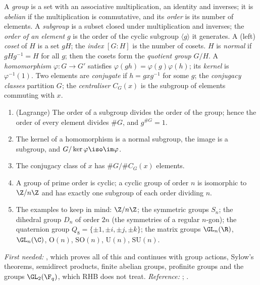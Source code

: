 \begin{definition}[groups]\label{def:prereq:groups}
A \emph{group} is a set with an associative multiplication, an identity and inverses; it is
\emph{abelian} if the multiplication is commutative, and its \emph{order} is its number of
elements. A \emph{subgroup} is a subset closed under multiplication and inverses; the
\emph{order of an element} $g$ is the order of the cyclic subgroup $\langle g\rangle$ it generates.
A (left) \emph{coset} of $H$ is a set $gH$; the \emph{index} $[G:H]$ is the number of cosets. $H$ is
\emph{normal} if $gHg^{-1}=H$ for all $g$; then the cosets form the \emph{quotient group} $G/H$. A
\emph{homomorphism} $\varphi\colon G\to G'$ satisfies $\varphi(gh)=\varphi(g)\varphi(h)$; its
\emph{kernel} is $\varphi^{-1}(1)$. Two elements are \emph{conjugate} if $h=gxg^{-1}$ for some $g$;
the \emph{conjugacy classes} partition $G$; the \emph{centraliser} $C_G(x)$ is the subgroup of
elements commuting with $x$.
\end{definition}

\begin{theorem}\label{thm:prereq:groups}
\begin{enumerate}[label=(\alph*)]
\item (Lagrange) The order of a subgroup divides the order of the group; hence the order of every
element divides $\#G$, and $g^{\#G}=1$.
\item The kernel of a homomorphism is a normal subgroup, the image is a subgroup, and
$G/\ker\varphi\iso\im\varphi$.
\item The conjugacy class of $x$ has $\#G/\#C_G(x)$ elements.
\item A group of prime order is cyclic; a cyclic group of order $n$ is isomorphic to $\Z/n\Z$ and
has exactly one subgroup of each order dividing $n$.
\item The examples to keep in mind: $\Z/n\Z$; the symmetric groups $S_n$; the dihedral group $D_n$
of order $2n$ (the symmetries of a regular $n$-gon); the quaternion group
$Q_8=\{\pm1,\pm i,\pm j,\pm k\}$; the matrix groups $\GL_n(\R)$, $\GL_n(\C)$, $\mathrm O(n)$,
$\mathrm{SO}(n)$, $\mathrm U(n)$, $\mathrm{SU}(n)$.
\end{enumerate}
\end{theorem}
\noindent\emph{First needed:} , which proves all of this and continues with group
actions, Sylow's theorems, semidirect products, finite abelian groups, profinite groups and the
groups $\GL_2(\F_q)$, which RHB does not treat. \emph{Reference:} \cite[Chapter 28]{RHB06};
\cite[Chapters 1 to 3]{DummitFoote}.

